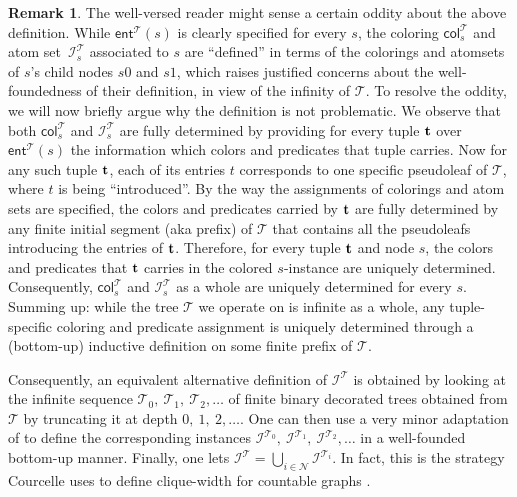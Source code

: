\documentclass[10pt,a4paper]{amsart}
\theoremstyle{definition}
\newtheorem{rem}[rem]{Remark}
\numberwithin{equation}{section}
\theoremstyle{plain}
\theoremstyle{definition}
\newtheorem{remark}[remark]{Remark}
\theoremstyle{myexample}
\renewenvironment{remark}%
{
	\begin{shaded*}	
		\vspace{-1.5ex}
		\begin{rem}%
		}{
		\end{rem}
		\vspace{-1.5ex}
	\end{shaded*}
}
\theoremstyle{plain}
\theoremstyle{definition}
\newcommand{\instance}{\mathcal{I}}
\newcommand{\inst}{\instance}
\newcommand{\fcn}[1]{\mathsf{#1}}
\begin{document}
\begin{remark}
The well-versed reader might sense a certain oddity about the above definition. While $\fcn{ent}^\mathcal{T}\!(s)$ is clearly specified for every $s$, the coloring $\fcn{col}^{\mathcal{T}}_s$ and atom set~$\inst^{\mathcal{T}}_{s}$ associated to $s$ are ``defined'' in terms of the colorings and atomsets of $s$'s  child nodes $s0$ and $s1$, which raises justified concerns about the well-foundedness of their definition, in view of the infinity of $\mathcal{T}$. To resolve the oddity, we will now briefly argue why the definition is not problematic.
We observe that both $\fcn{col}^{\mathcal{T}}_s$ and  $\inst^{\mathcal{T}}_{s}$ are fully determined by providing for every tuple $\bold{t}$ over $\fcn{ent}^\mathcal{T}(s)$ the information which colors and predicates that tuple carries.
Now for any such tuple $\bold{t}$, each of its entries $t$ corresponds to one specific pseudoleaf of $\mathcal{T}$, where $t$ is being ``introduced''. By the way the assignments of colorings and atom sets are specified, the colors and predicates carried by $\bold{t}$ are fully determined by any finite initial segment (aka prefix) of $\mathcal{T}$ that contains all the pseudoleafs introducing the entries of $\bold{t}$. Therefore, for every tuple $\bold{t}$ and node $s$, the colors and predicates that $\bold{t}$ carries in the colored $s$-instance are uniquely determined. Consequently, $\fcn{col}^{\mathcal{T}}_s$ and  $\inst^{\mathcal{T}}_{s}$ as a whole are uniquely determined for every $s$.  
Summing up: while the tree $\mathcal{T}$ we operate on is infinite as a whole, any tuple-specific coloring and predicate assignment is uniquely determined through a (bottom-up) inductive definition on some finite prefix of $\mathcal{T}$.

Consequently, an equivalent alternative definition of $\inst^\mathcal{T}$ is obtained by looking at the infinite sequence $\mathcal{T}_0,\ \mathcal{T}_1,\ \mathcal{T}_2,\ldots$ of finite binary decorated trees obtained from $\mathcal{T}$ by truncating it at depth $0,\ 1,\ 2,\ldots$. One can then use a very minor adaptation of  to define the corresponding instances $\inst^{\mathcal{T}_0},\ \inst^{\mathcal{T}_1},\  \inst^{\mathcal{T}_2},\ldots$ in a well-founded bottom-up manner. Finally, one lets $\inst^\mathcal{T} = \bigcup_{i\in \mathcal{N}}\inst^{\mathcal{T}_i}$. In fact, this is the strategy Courcelle uses to define clique-width for countable graphs \cite{Cou04}. 



\end{remark}
\end{document}

